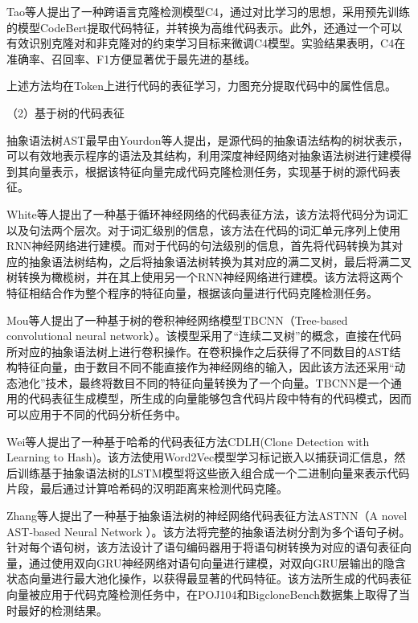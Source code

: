 Tao等人\cite{9796359}提出了一种跨语言克隆检测模型C4，通过对比学习的思想，采用预先训练的模型CodeBert提取代码特征，并转换为高维代码表示。此外，还通过一个可以有效识别克隆对和非克隆对的约束学习目标来微调C4模型。实验结果表明，C4在准确率、召回率、F1方便显著优于最先进的基线。

上述方法均在Token上进行代码的表征学习，力图充分提取代码中的属性信息。

（2）基于树的代码表征

抽象语法树AST最早由Yourdon等人\cite{10.1145/1499949.1499997}提出，是源代码的抽象语法结构的树状表示，可以有效地表示程序的语法及其结构，利用深度神经网络对抽象语法树进行建模得到其向量表示，根据该特征向量完成代码克隆检测任务，实现基于树的源代码表征。

White等人\cite{White2016DeepLC}提出了一种基于循环神经网络的代码表征方法，该方法将代码分为词汇以及句法两个层次。对于词汇级别的信息，该方法在代码的词汇单元序列上使用RNN神经网络进行建模。而对于代码的句法级别的信息，首先将代码转换为其对应的抽象语法树结构，之后将抽象语法树转换为其对应的满二叉树，最后将满二叉树转换为橄榄树，并在其上使用另一个RNN神经网络进行建模。该方法将这两个特征相结合作为整个程序的特征向量，根据该向量进行代码克隆检测任务。

Mou等人\cite{WOS:000485474201046}提出了一种基于树的卷积神经网络模型TBCNN（Tree-based convolutional neural network）。该模型采用了“连续二叉树”的概念，直接在代码所对应的抽象语法树上进行卷积操作。在卷积操作之后获得了不同数目的AST结构特征向量，由于数目不同不能直接作为神经网络的输入，因此该方法还采用“动态池化”技术，最终将数目不同的特征向量转换为了一个向量。TBCNN是一个通用的代码表征生成模型，所生成的向量能够包含代码片段中特有的代码模式，因而可以应用于不同的代码分析任务中。

Wei等人\cite{10.5555/3172077.3172312}提出了一种基于哈希的代码表征方法CDLH(Clone Detection with Learning to Hash)。该方法使用Word2Vec模型学习标记嵌入以捕获词汇信息，然后训练基于抽象语法树的LSTM模型将这些嵌入组合成一个二进制向量来表示代码片段，最后通过计算哈希码的汉明距离来检测代码克隆。

Zhang等人\cite{8812062}提出了一种基于抽象语法树的神经网络代码表征方法ASTNN（A novel AST-based Neural Network ）。该方法将完整的抽象语法树分割为多个语句子树。针对每个语句树，该方法设计了语句编码器用于将语句树转换为对应的语句表征向量，通过使用双向GRU神经网络对语句向量进行建模，对双向GRU层输出的隐含状态向量进行最大池化操作，以获得最显著的代码特征。该方法所生成的代码表征向量被应用于代码克隆检测任务中，在POJ104\cite{WOS:000485474201046}和BigcloneBench\cite{7332459}数据集上取得了当时最好的检测结果。

